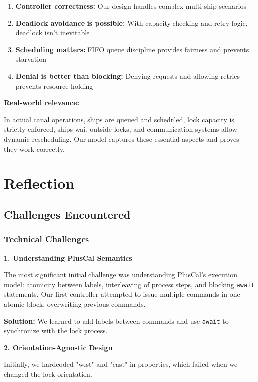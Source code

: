 \documentclass[12pt,a4paper]{article}
\begin{document}
\begin{enumerate}
    \item \textbf{Controller correctness:} Our design handles complex multi-ship scenarios
    \item \textbf{Deadlock avoidance is possible:} With capacity checking and retry logic, deadlock isn't inevitable
    \item \textbf{Scheduling matters:} FIFO queue discipline provides fairness and prevents starvation
    \item \textbf{Denial is better than blocking:} Denying requests and allowing retries prevents resource holding
\end{enumerate}

\textbf{Real-world relevance:}

In actual canal operations, ships are queued and scheduled, lock capacity is strictly enforced, ships wait outside locks, and communication systems allow dynamic rescheduling. Our model captures these essential aspects and proves they work correctly.

\newpage
\section{Reflection}

\subsection{Challenges Encountered}

\subsubsection{Technical Challenges}

\textbf{1. Understanding PlusCal Semantics}

The most significant initial challenge was understanding PlusCal's execution model: atomicity between labels, interleaving of process steps, and blocking \texttt{await} statements. Our first controller attempted to issue multiple commands in one atomic block, overwriting previous commands.

\textbf{Solution:} We learned to add labels between commands and use \texttt{await} to synchronize with the lock process.

\textbf{2. Orientation-Agnostic Design}

Initially, we hardcoded "west" and "east" in properties, which failed when we changed the lock orientation.
\end{document}
